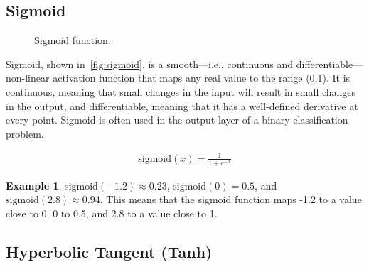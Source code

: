 \documentclass[oneside,11pt,dvipsnames]{book}
\numberwithin{equation}{section}
\theoremstyle{definition}
\newtheorem{example}{Example}[section]
\theoremstyle{remark}
\newcommand{\sigmoid}[1]{\mathrm{sigmoid}\left(#1\right)}
\begin{document}
\subsection{Sigmoid}\label{sec:sigmoid}



\begin{figure}[ht]
    \centering
    \caption{Sigmoid function.}\label{fig:sigmoid}
\end{figure}

Sigmoid, shown in~\autoref{fig:sigmoid}, is a smooth---i.e., continuous and differentiable---non-linear activation function that maps any real value to the range (0,1).
It is continuous, meaning that small changes in the input will result in small changes in the output, and differentiable, meaning that it has a well-defined derivative at every point. Sigmoid is often used in the output layer of a binary classification problem.

    \begin{align}
        \sigmoid{x} = \frac{1}{1+e^{-x}}
    \end{align}

\begin{example}
$\sigmoid{-1.2} \approx 0.23$, $\sigmoid{0} = 0.5$, and $\sigmoid{2.8} \approx 0.94$. This means that the sigmoid function maps -1.2 to a value close to 0, 0 to 0.5, and 2.8 to a value close to 1.
\end{example}

\subsection{Hyperbolic Tangent (Tanh)}\label{sec:tanh}
\end{document}
